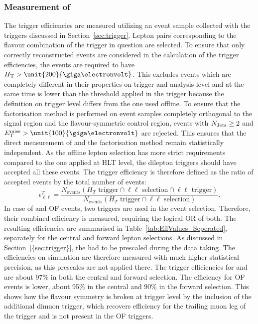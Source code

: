 \subsubsection{Measurement of \RT}
\label{sec:triggerEffs}
The trigger efficiencies are measured utilizing an event sample collected with the \HT triggers discussed in Section~\ref{sec:trigger}. Lepton pairs corresponding to the flavour combination of the trigger in question are selected. To ensure that only correctly reconstructed events are considered in the calculation of the trigger efficiencies, the events are required to have $\HT > \unit{200}{\giga\electronvolt}$. This excludes events which are completely different in their properties on trigger and analysis level and at the same time is lower than the threshold applied in the trigger because the \HT definition on trigger level differs from the one used offline. To ensure that the factorisation method is performed on event samples completely orthogonal to the signal region and the flavour-symmetric control region, events with $N_\text{Jets} \geq 2$ and $\MET > \unit{100}{\giga\electronvolt}$ are rejected. This ensures that the direct measurement of \Rsfof and the factorisation method remain statistically independent. As the offline lepton selection has more strict requirements compared to the one applied at HLT level, the dilepton triggers should have accepted all these events. The trigger efficiency is therefore defined as the ratio of accepted events by the total number of events:
\begin{equation*}
\epsilon_{\ell\ell}^T = \frac{N_{\text{events}}(H_T\text{ trigger} \cap \ell\ell\text{ selection} \cap \ell\ell\text{ trigger})}{N_{\text{events}}(H_T\text{ trigger} \cap \ell\ell\text{ selection})}.
\end{equation*}
In case of \MM and OF events, two triggers are used in the event selection. Therefore, their combined efficiency is measured, requiring the logical OR of both. The resulting efficiencies are summarised in Table~\ref{tab:EffValues_Seperated}, separately for the central and forward lepton selections. As discussed in Section~\ref{{sec:trigger}}, the \HT had to be prescaled during the data taking. The efficiencies on simulation are therefore measured with much higher statistical precision, as this prescales are not applied there. The trigger efficiencies for \EE and \MM are about 97\% in both the central and forward selection. The efficiency for OF events is lower, about 95\% in the central and 90\% in the forward selection. This shows how the flavour symmetry is broken at trigger level by the inclusion of the additional dimuon trigger, which recovers efficiency for the trailing muon leg of the trigger and is not present in the OF triggers.   
